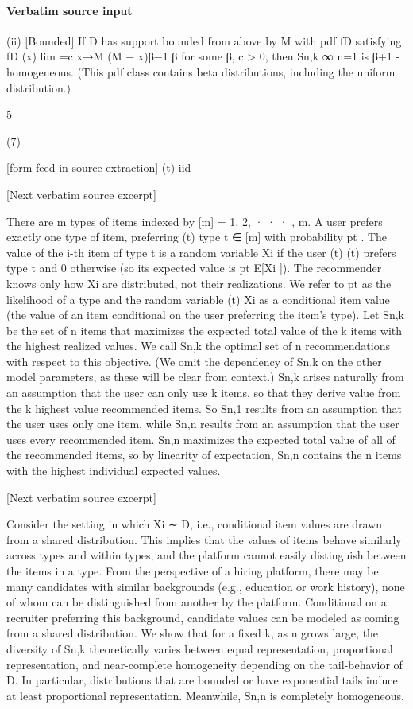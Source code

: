 \documentclass[10pt]{article}
\begin{document}
\paragraph{Verbatim source input}
\begin{ReviewVerbatim}
(ii) [Bounded] If D has support bounded from above by M with pdf fD satisfying
fD (x)
lim
=c
x→M (M − x)β−1
β
for some β, c > 0, then {Sn,k }∞
n=1 is β+1 -homogeneous.
(This pdf class contains beta distributions, including the uniform distribution.)

5

(7)


[form-feed in source extraction]
(t) iid

[Next verbatim source excerpt]

There are m types of items indexed by [m] = {1, 2, · · · , m}. A user prefers exactly one type of item, preferring
(t)
type t ∈ [m] with probability pt . The value of the i-th item of type t is a random variable Xi if the user
(t)
(t)
prefers type t and 0 otherwise (so its expected value is pt E[Xi ]). The recommender knows only how Xi
are distributed, not their realizations. We refer to pt as the likelihood of a type and the random variable
(t)
Xi as a conditional item value (the value of an item conditional on the user preferring the item’s type).
Let Sn,k be the set of n items that maximizes the expected total value of the k items with the highest
realized values. We call Sn,k the optimal set of n recommendations with respect to this objective. (We omit
the dependency of Sn,k on the other model parameters, as these will be clear from context.)
Sn,k arises naturally from an assumption that the user can only use k items, so that they derive value
from the k highest value recommended items. So Sn,1 results from an assumption that the user uses only
one item, while Sn,n results from an assumption that the user uses every recommended item.
Sn,n maximizes the expected total value of all of the recommended items, so by linearity of expectation,
Sn,n contains the n items with the highest individual expected values.

[Next verbatim source excerpt]

Consider the setting in which Xi ∼ D, i.e., conditional item values are drawn from a shared distribution.
This implies that the values of items behave similarly across types and within types, and the platform cannot
easily distinguish between the items in a type. From the perspective of a hiring platform, there may be many
candidates with similar backgrounds (e.g., education or work history), none of whom can be distinguished
from another by the platform. Conditional on a recruiter preferring this background, candidate values can
be modeled as coming from a shared distribution.
We show that for a fixed k, as n grows large, the diversity of Sn,k theoretically varies between equal
representation, proportional representation, and near-complete homogeneity depending on the tail-behavior
of D. In particular, distributions that are bounded or have exponential tails induce at least proportional
representation. Meanwhile, Sn,n is completely homogeneous.


\end{ReviewVerbatim}
\end{document}

